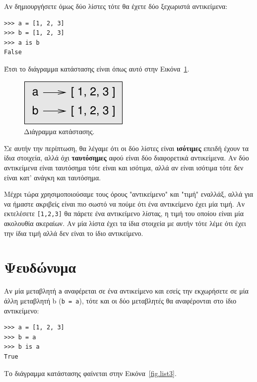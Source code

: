 \documentclass[10pt]{book}
\begin{document}
Αν δημιουργήσετε όμως δύο λίστες τότε θα έχετε δύο ξεχωριστά αντικείμενα:

\begin{verbatim}
>>> a = [1, 2, 3]
>>> b = [1, 2, 3]
>>> a is b
False
\end{verbatim}
%
Έτσι το διάγραμμα κατάστασης είναι όπως αυτό στην Εικόνα~\ref{fig.list2}.

\begin{figure}
\centerline
{\includegraphics[scale=0.8]{figs/list2.pdf}}
 \caption{Διάγραμμα κατάστασης.} 
\label{fig.list2}
\end{figure}


Σε αυτήν την περίπτωση, θα λέγαμε ότι οι δύο λίστες είναι {\bf ισότιμες} επειδή έχουν τα ίδια στοιχεία, αλλά όχι {\bf ταυτόσημες} αφού είναι δύο διαφορετικά αντικείμενα. Αν δύο αντικείμενα είναι ταυτόσημα τότε είναι και ισότιμα, αλλά αν είναι ισότιμα τότε δεν είναι κατ' ανάγκη και ταυτόσημα.

Μέχρι τώρα χρησιμοποιούσαμε τους όρους "αντικείμενο" και "τιμή" εναλλάξ, αλλά για να ήμαστε ακριβείς είναι πιο σωστό να πούμε ότι ένα αντικείμενο έχει μία τιμή. Αν εκτελέσετε {\tt [1,2,3]} θα πάρετε ένα αντικείμενο λίστας, η τιμή του οποίου είναι μία ακολουθία ακεραίων. Αν μία λίστα έχει τα ίδια στοιχεία με αυτήν τότε λέμε ότι έχει την ίδια τιμή αλλά δεν είναι το ίδιο αντικείμενο.


\section{Ψευδώνυμα}

Αν μία μεταβλητή {\tt a} αναφέρεται σε ένα αντικείμενο και εσείς την εκχωρήσετε σε μία άλλη μεταβλητή b ({\tt b = a}), τότε και οι δύο μεταβλητές θα αναφέρονται στο ίδιο αντικείμενο:

\begin{verbatim}
>>> a = [1, 2, 3]
>>> b = a
>>> b is a
True
\end{verbatim}
%
 
Το διάγραμμα κατάστασης φαίνεται στην Εικόνα~\ref{fig.list3}.
\end{document}
